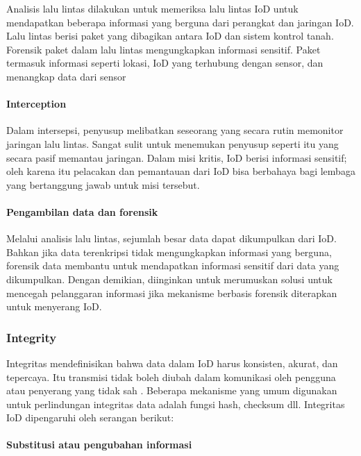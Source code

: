 Analisis lalu lintas dilakukan untuk memeriksa lalu lintas IoD untuk mendapatkan beberapa informasi yang berguna dari perangkat dan jaringan IoD. Lalu lintas berisi paket yang dibagikan antara IoD dan sistem kontrol tanah. Forensik paket dalam lalu lintas mengungkapkan informasi sensitif. Paket termasuk informasi seperti lokasi, IoD yang terhubung dengan sensor, dan menangkap data dari sensor

\paragraph{Interception}
\label{par:interception}

Dalam intersepsi, penyusup melibatkan seseorang yang secara rutin memonitor jaringan lalu lintas. Sangat sulit untuk menemukan penyusup seperti itu yang secara pasif memantau jaringan. Dalam misi kritis, IoD berisi informasi sensitif; oleh karena itu pelacakan dan pemantauan dari IoD bisa berbahaya bagi lembaga yang bertanggung jawab untuk misi tersebut.

\paragraph{Pengambilan data dan forensik}
\label{par:forensik}

Melalui analisis lalu lintas, sejumlah besar data dapat dikumpulkan dari IoD. Bahkan jika data terenkripsi tidak mengungkapkan informasi yang berguna, forensik data membantu untuk mendapatkan informasi sensitif dari data yang dikumpulkan. Dengan demikian, diinginkan untuk merumuskan solusi untuk mencegah pelanggaran informasi jika mekanisme berbasis forensik diterapkan untuk menyerang IoD.

\subsubsection{Integrity}
\label{subsubsec:integrity}

Integritas mendefinisikan bahwa data dalam IoD harus konsisten, akurat, dan tepercaya. Itu transmisi tidak boleh diubah dalam komunikasi oleh pengguna atau penyerang yang tidak sah \citep{hartmann2013vulnerability}. Beberapa mekanisme yang umum digunakan untuk perlindungan integritas data adalah fungsi hash, checksum dll. Integritas IoD dipengaruhi oleh serangan berikut:

\paragraph{Substitusi atau pengubahan
informasi}
\label{par:substitusi}

